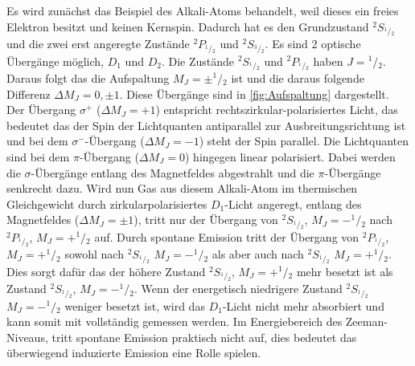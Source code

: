 Es wird zunächst das Beispiel des Alkali-Atoms behandelt, weil dieses ein freies Elektron besitzt und keinen Kernspin.
Dadurch hat es den Grundzustand ${}^2S_{{}^1\!/\!_2}$ und die zwei erst angeregte Zustände ${}^2P_{{}^1\!/\!_2}$ und ${}^2S_{{}^3\!/\!_2}$.
Es sind 2 optische Übergänge möglich, $D_1$ und $D_2$.
Die Zustände ${}^2S_{{}^1\!/\!_2}$ und ${}^2P_{{}^1\!/\!_2}$ haben $J={}^1\!/\!_2$. 
Daraus folgt das die Aufspaltung $M_J=\pm^1\!/\!_2$ ist und die daraus folgende Differenz $\Delta M_J = 0 ,\pm1$. Diese Übergänge sind in \cref{fig:Aufspaltung} dargestellt.\\
Der Übergang $\sigma^+$ ($\Delta M_J=+1$) entspricht rechtszirkular-polarisiertes Licht, das bedeutet das der Spin der Lichtquanten antiparallel zur Ausbreitungsrichtung ist und bei dem $\sigma^-$-Übergang ($\Delta M_J=-1$) steht der Spin parallel. 
Die Lichtquanten sind bei dem $\pi$-Übergang ($\Delta M_J=0$) hingegen linear polarisiert. 
Dabei werden die $\sigma$-Übergänge entlang des Magnetfeldes abgestrahlt und die $\pi$-Übergänge senkrecht dazu.
Wird nun Gas aus diesem Alkali-Atom im thermischen Gleichgewicht durch zirkularpolarisiertes $D_1$-Licht angeregt, entlang des Magnetfeldes ($\Delta M_J=\pm1$), tritt nur der Übergang von ${}^2S_{^1\!/\!_2}$, $M_J=-^1\!/\!_2$ nach ${}^2P_{^1\!/\!_2}$, $M_J=+^1\!/\!_2$ auf. Durch spontane Emission tritt der Übergang von ${}^2P_{^1\!/\!_2}$, $M_J=+^1\!/\!_2$ sowohl nach ${}^2S_{^1\!/\!_2}$ $M_J=-^1\!/\!_2$ als aber auch nach ${}^2S_{^1\!/\!_2}$ $M_J=+^1\!/\!_2$. 
Dies sorgt dafür das der höhere Zustand ${}^2S_{^1\!/\!_2}$, $M_J=+^1\!/\!_2$ mehr besetzt ist als Zustand ${}^2S_{^1\!/\!_2}$, $M_J=-^1\!/\!_2$.
Wenn der energetisch niedrigere Zustand ${}^2S_{^1\!/\!_2}$ $M_J=-^1\!/\!_2$ weniger besetzt ist, wird das $D_1$-Licht nicht mehr absorbiert und kann somit mit vollständig gemessen werden.
Im Energiebereich des Zeeman-Niveaus, tritt spontane Emission praktisch nicht auf, dies bedeutet das überwiegend induzierte Emission eine Rolle spielen.
\newpage
